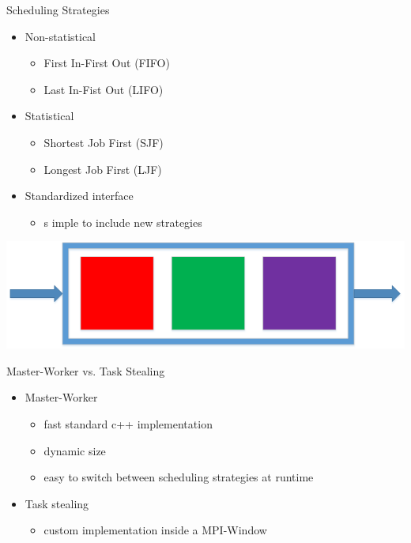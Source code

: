 	\begin{frame}{Scheduling Strategies}
	\begin{minipage}[]{.7\textwidth}%
			\begin{itemize}
		\item<2-> Non-statistical
		\begin{itemize}
			\item<3-> First In-First Out (FIFO)
			\item<4-> Last In-Fist Out (LIFO)
		\end{itemize}
		\item<5-> Statistical
		\begin{itemize}
			\item<6-> Shortest Job First (SJF)
			\item<7-> Longest Job First (LJF)
		\end{itemize}
		\item<8-> Standardized interface 
			\begin{itemize}
				\item<9-> s imple to include new strategies
			\end{itemize}					
		\end{itemize}
\end{minipage}%
\begin{minipage}[]{.3\textwidth}%
  \includegraphics[width=\textwidth]{images/fifo}%
\end{minipage}		
		
	\end{frame}
	\begin{frame}{Master-Worker vs. Task Stealing}
		\begin{itemize}
			\item<2-> Master-Worker
				\begin{itemize}
					\item<3-> fast standard c++ implementation
					\item<4-> dynamic size
					\item<5-> easy to switch between scheduling strategies at runtime	
				\end{itemize}
			
			\item<6-> Task stealing
					\begin{itemize}
						\item<7-> custom implementation inside a MPI-Window
					\end{itemize}
			
		\end{itemize}
	\end{frame}
